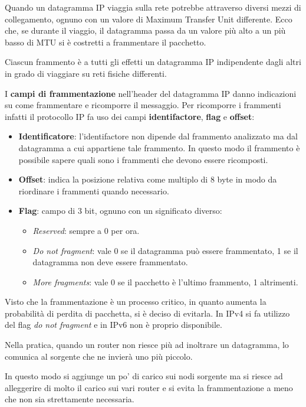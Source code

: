 Quando un datagramma IP viaggia sulla rete potrebbe attraverso diversi mezzi di collegamento,
ognuno con un valore di Maximum Transfer Unit differente. Ecco che, se durante il viaggio, il 
datagramma passa da un valore più alto a un più basso di MTU si è costretti a frammentare il 
pacchetto.

Ciascun frammento è a tutti gli effetti un datagramma IP indipendente dagli altri in grado di 
viaggiare su reti fisiche differenti.

I \textbf{campi di frammentazione} nell'header del datagramma IP danno indicazioni su come
frammentare e ricomporre il messaggio. Per ricomporre i frammenti infatti il protocollo IP fa uso
dei campi \textbf{identifactore}, \textbf{flag} e \textbf{offset}:
\begin{itemize}
	\item \textbf{Identificatore}: l'identifactore non dipende dal frammento analizzato ma dal 
		datagramma a cui appartiene tale frammento. In questo modo il frammento è possibile sapere
		quali sono i frammenti che devono essere ricomposti.
	\item \textbf{Offset}: indica la posizione relativa come multiplo di 8 byte in modo da 
		riordinare i frammenti quando necessario.
	\item \textbf{Flag}: campo di 3 bit, ognuno con un significato diverso:
		\begin{itemize}
			\item \emph{Reserved}: sempre a 0 per ora.
			\item \emph{Do not fragment}: vale 0 se il datagramma può essere frammentato, 1 se il
				datagramma non deve essere frammentato.
			\item \emph{More fragments}: vale 0 se il pacchetto è l'ultimo frammento, 1 altrimenti.
		\end{itemize}
\end{itemize}
Visto che la frammentazione è un processo critico, in quanto aumenta la probabilità di perdita di
pacchetta, si è deciso di evitarla. In IPv4 si fa utilizzo del flag \emph{do not fragment} e in
IPv6 non è proprio disponibile.

Nella pratica, quando un router non riesce più ad inoltrare un datagramma, lo comunica al sorgente
che ne invierà uno più piccolo.

In questo modo si aggiunge un po' di carico sui nodi sorgente ma si riesce ad alleggerire di molto
il carico sui vari router e si evita la frammentazione a meno che non sia strettamente necessaria.

